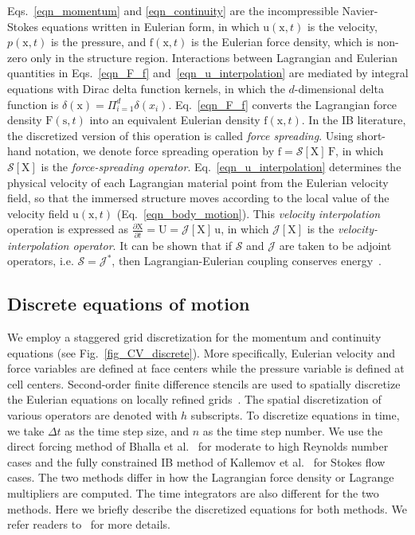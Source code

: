 \documentclass[review]{elsarticle}
\newcommand \D [2]{\frac{\partial #1}{\partial #2}}
\renewcommand{\vec}[1]{\bm{\mathrm{#1}}}
\def \x{\vec{x}}
\def \u{\vec{u}}
\def \F{\vec{F}}
\def \U{\vec{U}}
\def \F{\vec{F}}
\def \U{\vec{U}}
\def \X{\vec{X}}
\def \cS{\vec{\mathcal{S}}}
\def \cJ{\vec{\mathcal{J}}}
\def \f{\vec{f}}
\def \s{\vec{s}}
\def \u{\vec{u}}
\def \x{\vec{x}}
\def \dt{\Delta t}
\def \dt{\Delta t}
\begin{document}
Eqs.~\eqref{eqn_momentum} and \eqref{eqn_continuity} are the incompressible 
Navier-Stokes equations written in Eulerian form, in which $\u(\x,t)$ is the velocity, 
$p(\x,t)$ is the pressure, and $\f(\x,t)$ is the Eulerian force density, which is non-zero 
only in the structure region. Interactions between Lagrangian and Eulerian quantities 
in Eqs.~\eqref{eqn_F_f} and~\eqref{eqn_u_interpolation} are mediated by integral 
equations with Dirac delta function kernels, in which the $d$-dimensional delta function 
is $\delta(\x) = \Pi_{i=1}^{d}\delta(x_i)$. Eq.~\eqref{eqn_F_f} converts the Lagrangian 
force density $\F(\s,t)$ into an equivalent Eulerian density $\f(\x,t)$. In the IB literature,
the discretized version of this operation is called \emph{force spreading}.
Using short-hand notation, we denote force spreading operation by $\f = \cS[\X] \, \F$, 
in which $\cS[\X]$ is the \emph{force-spreading operator}.
Eq.~\eqref{eqn_u_interpolation} determines the physical velocity of each Lagrangian 
material point from the Eulerian velocity field, so that the immersed structure moves 
according to the local value of the velocity field $\u(\x,t)$ (Eq.~\eqref{eqn_body_motion}).
This \emph{velocity interpolation} operation is expressed as $\D{\X}{t} = \U = \cJ[\X] \, \u$, 
in which $\cJ[\X]$ is the \emph{velocity-interpolation operator}. It can be shown that
if $\cS$ and $\cJ$ are taken to be adjoint operators, i.e. $\cS = \cJ^{*}$, then 
Lagrangian-Eulerian coupling conserves energy~\cite{Peskin02}.

\subsection{Discrete equations of motion}

We employ a staggered grid discretization for the momentum and continuity equations
(see Fig.~\ref{fig_CV_discrete}). More specifically, Eulerian velocity and force 
variables are defined at face centers while the pressure variable is defined at cell centers. 
Second-order finite difference stencils are used to spatially discretize the Eulerian equations  
on locally refined grids~\cite{Bhalla13,Griffith07}.  The spatial discretization of various operators
are denoted with $h$ subscripts. To discretize equations in time, 
we take $\dt$ as the time step size, and $n$ as the time step number. 
We use the direct forcing method of Bhalla et al.~\cite{Bhalla13}  
for moderate to high Reynolds number cases and the fully constrained IB method
of Kallemov et al.~\cite{Kallemov16} for Stokes flow cases. The two methods differ in how 
the Lagrangian force density or Lagrange multipliers are computed. The time 
integrators are also different for the two methods. Here we briefly describe the 
discretized equations for both methods. We refer 
readers to~\cite{Bhalla13,Kallemov16,Usabiaga17} for more details. 
 
\end{document}
